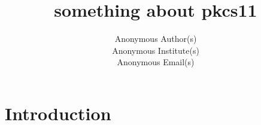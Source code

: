 \documentclass[conference]{IEEEtran}
\begin{document}

\date{}

\title{
  \Large \bf
  something about pkcs11
}

\author{
{Anonymous Author(s)}
\\
{Anonymous Institute(s)}
\\
{Anonymous Email(s)}
} %

\maketitle

\begin{abstract}
\end{abstract}


\section{Introduction}\label{sec:intro}






\end{document}
